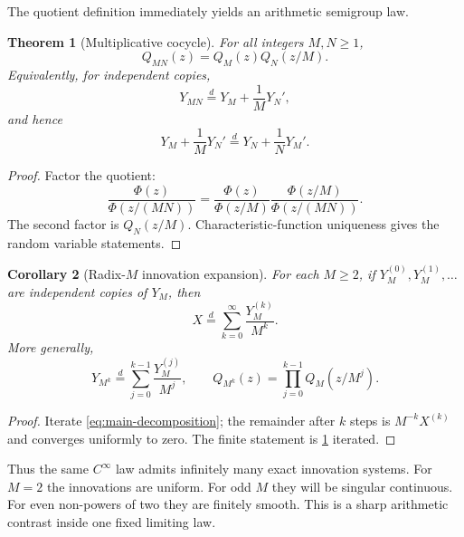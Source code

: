 \documentclass[11pt,oneside]{article}
\newtheorem{theorem}{Theorem}[section]
\newtheorem{corollary}[theorem]{Corollary}
\theoremstyle{definition}
\theoremstyle{remark}
\begin{document}
The quotient definition immediately yields an arithmetic semigroup law.

\begin{theorem}[Multiplicative cocycle]
\label{thm:cocycle}
For all integers $M,N\ge1$,
\begin{equation}
 Q_{MN}(z)=Q_M(z)Q_N(z/M).
 \label{eq:QM-cocycle}
\end{equation}
Equivalently, for independent copies,
\begin{equation}
 Y_{MN}\overset d=Y_M+\frac1M Y_N',
 \label{eq:Y-cocycle}
\end{equation}
and hence
\begin{equation}
 Y_M+\frac1M Y_N'
 \overset d=
 Y_N+\frac1N Y_M'.
 \label{eq:cocycle-commutation}
\end{equation}
\end{theorem}

\begin{proof}
Factor the quotient:
\[
 \frac{\Phi(z)}{\Phi(z/(MN))}
 =\frac{\Phi(z)}{\Phi(z/M)}
  \frac{\Phi(z/M)}{\Phi(z/(MN))}.
\]
The second factor is $Q_N(z/M)$.  Characteristic-function uniqueness gives the random
variable statements.
\end{proof}

\begin{corollary}[Radix-$M$ innovation expansion]
\label{cor:innovation}
For each $M\ge2$, if $Y_M^{(0)},Y_M^{(1)},\ldots$ are independent copies of $Y_M$, then
\begin{equation}
 X\overset d=\sum_{k=0}^{\infty}\frac{Y_M^{(k)}}{M^k}.
 \label{eq:innovation-expansion}
\end{equation}
More generally,
\begin{equation}
 Y_{M^k}\overset d=
 \sum_{j=0}^{k-1}\frac{Y_M^{(j)}}{M^j},
 \qquad
 Q_{M^k}(z)=\prod_{j=0}^{k-1}Q_M(z/M^j).
 \label{eq:finite-innovation}
\end{equation}
\end{corollary}

\begin{proof}
Iterate \eqref{eq:main-decomposition}; the remainder after $k$ steps is $M^{-k}X^{(k)}$
and converges uniformly to zero.  The finite statement is \cref{thm:cocycle} iterated.
\end{proof}

Thus the same $C^\infty$ law admits infinitely many exact innovation systems.  For
$M=2$ the innovations are uniform.  For odd $M$ they will be singular continuous.  For
even non-powers of two they are finitely smooth.  This is a sharp arithmetic contrast
inside one fixed limiting law.
\end{document}
